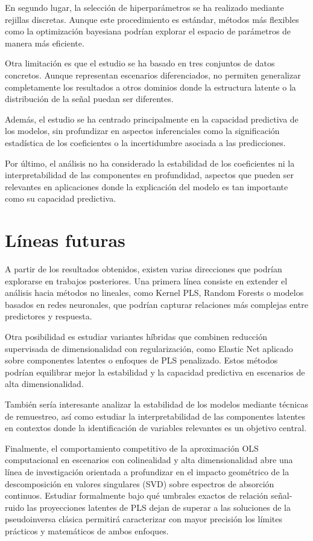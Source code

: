 \documentclass[12pt,a4paper]{report}
\begin{document}
En segundo lugar, la selección de hiperparámetros se ha realizado mediante rejillas discretas. Aunque este procedimiento es estándar, métodos más flexibles como la optimización bayesiana podrían explorar el espacio de parámetros de manera más eficiente.

Otra limitación es que el estudio se ha basado en tres conjuntos de datos concretos. Aunque representan escenarios diferenciados, no permiten generalizar completamente los resultados a otros dominios donde la estructura latente o la distribución de la señal puedan ser diferentes.

Además, el estudio se ha centrado principalmente en la capacidad predictiva de los modelos, sin profundizar en aspectos inferenciales como la significación estadística de los coeficientes o la incertidumbre asociada a las predicciones.

Por último, el análisis no ha considerado la estabilidad de los coeficientes ni la interpretabilidad de las componentes en profundidad, aspectos que pueden ser relevantes en aplicaciones donde la explicación del modelo es tan importante como su capacidad predictiva.

\section{Líneas futuras}

A partir de los resultados obtenidos, existen varias direcciones que podrían explorarse en trabajos posteriores. Una primera línea consiste en extender el análisis hacia métodos no lineales, como Kernel PLS, Random Forests o modelos basados en redes neuronales, que podrían capturar relaciones más complejas entre predictores y respuesta.

Otra posibilidad es estudiar variantes híbridas que combinen reducción supervisada de dimensionalidad con regularización, como Elastic Net aplicado sobre componentes latentes o enfoques de PLS penalizado. Estos métodos podrían equilibrar mejor la estabilidad y la capacidad predictiva en escenarios de alta dimensionalidad.

También sería interesante analizar la estabilidad de los modelos mediante técnicas de remuestreo, así como estudiar la interpretabilidad de las componentes latentes en contextos donde la identificación de variables relevantes es un objetivo central.

Finalmente, el comportamiento competitivo de la aproximación OLS computacional en escenarios con colinealidad y alta dimensionalidad abre una línea de investigación orientada a profundizar en el impacto geométrico de la descomposición en valores singulares (SVD) sobre espectros de absorción continuos. Estudiar formalmente bajo qué umbrales exactos de relación señal-ruido las proyecciones latentes de PLS dejan de superar a las soluciones de la pseudoinversa clásica permitirá caracterizar con mayor precisión los límites prácticos y matemáticos de ambos enfoques.
\end{document}
